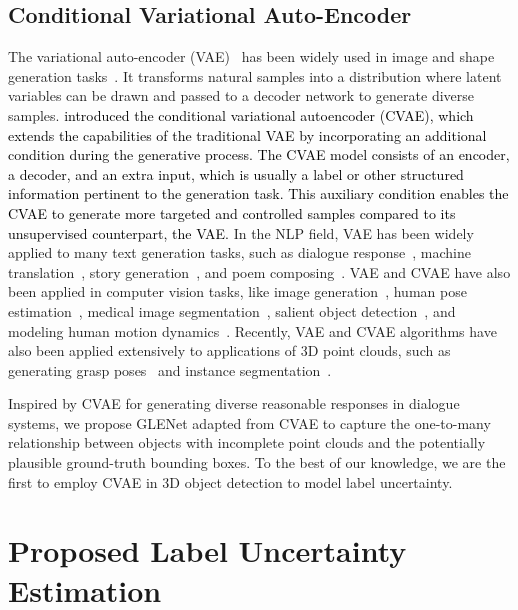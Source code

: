 \documentclass[twocolumn]{svjour3}
\newcommand{\revise}[1]{\textcolor{black}{#1}}
\begin{document}
\subsection{Conditional Variational Auto-Encoder}
The variational auto-encoder (VAE)~\citep{kingma2013auto} has been widely used in image and shape generation tasks~\citep{yan2016attribute2image,nash2017shape}. 
It transforms natural samples into a distribution where latent variables can be drawn and passed to a decoder network to generate diverse samples.
\revise{\cite{sohn2015learning} introduced the conditional variational autoencoder (CVAE), which extends the capabilities of the traditional VAE by incorporating an additional condition during the generative process. The CVAE model consists of an encoder, a decoder, and an extra input, which is usually a label or other structured information pertinent to the generation task. This auxiliary condition enables the CVAE to generate more targeted and controlled samples compared to its unsupervised counterpart, the VAE.}
In the NLP field, VAE has been widely applied to many text generation tasks, such as dialogue response~\citep{zhao2017learning}, machine translation~\citep{zhang-etal-2016-variational-neural}, story generation~\citep{wang2019t}, and poem composing~\citep{li2018generating}. VAE and CVAE have also been applied in computer vision tasks, like image generation~\citep{yan2016attribute2image}, human pose estimation~\citep{Sharma_2019_ICCV}, medical image segmentation~\citep{painchaud2020cardiac}, salient object detection~\citep{li2019supervae,zhang2020uc}, and modeling human motion dynamics~\citep{yan2018mt}.
Recently, VAE and CVAE algorithms have also been applied extensively to applications of 3D point clouds, such as generating grasp poses~\citep{mousavian20196} and instance segmentation~\citep{Yi_2019_CVPR}. 

Inspired by CVAE for generating diverse reasonable responses in dialogue systems, we propose GLENet adapted from CVAE to capture the one-to-many relationship between objects with incomplete point clouds and the potentially plausible ground-truth bounding boxes.
To the best of our knowledge, we are the first to employ CVAE in 3D object detection to model label uncertainty.


\section{Proposed Label Uncertainty Estimation}
\label{sec: proposed method}
\end{document}
